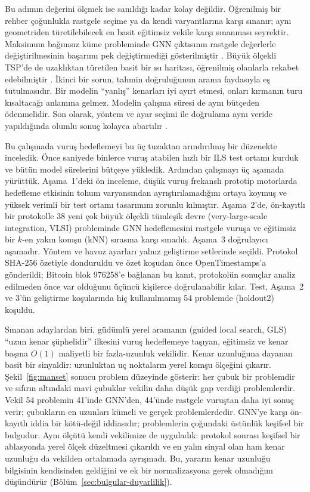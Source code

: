\documentclass[pdflatex,sn-basic]{sn-jnl}
\begin{document}
Bu adımın değerini ölçmek ise sanıldığı kadar kolay değildir. Öğrenilmiş bir rehber çoğunlukla
rastgele seçime ya da kendi varyantlarına karşı sınanır; aynı geometriden türetilebilecek en basit
eğitimsiz vekile karşı sınanması seyrektir. Maksimum bağımsız küme probleminde GNN çıktısının
rastgele değerlerle değiştirilmesinin başarımı pek değiştirmediği gösterilmiştir
\citep{bother_2022_wrong}. Büyük ölçekli TSP'de de uzaklıktan türetilen basit bir ısı haritası,
öğrenilmiş olanlarla rekabet edebilmiştir \citep{xia_2024_rethinking}. İkinci bir sorun, tahmin
doğruluğunun arama faydasıyla eş tutulmasıdır. Bir modelin ``yanlış'' kenarları iyi ayırt etmesi,
onları kırmanın turu kısaltacağı anlamına gelmez. Modelin çalışma süresi de aynı bütçeden
ödenmelidir. Son olarak, yöntem ve ayar seçimi ile doğrulama aynı veride yapıldığında olumlu sonuç
kolayca abartılır \citep{hooker_1995_testing, nosek_2018_prereg}.

Bu çalışmada vuruş hedeflemeyi bu üç tuzaktan arındırılmış bir düzenekte inceledik. Önce saniyede
binlerce vuruş atabilen hızlı bir ILS test ortamı kurduk ve bütün model sürelerini bütçeye yükledik.
Ardından çalışmayı üç aşamada yürüttük. Aşama~1'deki ön inceleme, düşük vuruş frekanslı prototip
motorlarda hedefleme etkisinin tohum varyansından ayrıştırılamadığını ortaya koymuş ve yüksek
verimli bir test ortamı tasarımını zorunlu kılmıştır. Aşama~2'de, ön-kayıtlı bir protokolle 38
yeni çok büyük ölçekli tümleşik devre (very-large-scale integration, VLSI) probleminde GNN
hedeflemesini rastgele vuruşa ve eğitimsiz bir $k$-en yakın komşu (kNN) sırasına karşı sınadık.
Aşama~3 doğrulayıcı aşamadır. Yöntem ve havuz ayarları yalnız geliştirme setlerinde seçildi. Protokol
SHA-256 özetiyle donduruldu ve özet koşudan önce OpenTimestamps'a gönderildi; Bitcoin blok
976258'e bağlanan bu kanıt, protokolün sonuçlar analiz edilmeden önce var olduğunu üçüncü
kişilerce doğrulanabilir kılar. Test, Aşama~2 ve 3'ün geliştirme koşularında hiç kullanılmamış 54
problemde (holdout2) koşuldu.

Sınanan adaylardan biri, güdümlü yerel aramanın (guided local search, GLS) ``uzun kenar şüphelidir''
ilkesini \citep{voudouris_1999_gls} vuruş hedeflemeye taşıyan, eğitimsiz ve kenar başına $O(1)$
maliyetli bir fazla-uzunluk vekilidir. Kenar uzunluğuna dayanan basit bir sinyaldir: uzunluktan uç
noktaların yerel komşu ölçeğini çıkarır. Şekil~\ref{fig:manset} sonucu problem düzeyinde gösterir: her çubuk bir problemdir ve
sıfırın altındaki mavi çubuklar vekilin daha düşük gap verdiği problemlerdir. Vekil 54 problemin
41'inde GNN'den, 44'ünde rastgele vuruştan daha iyi sonuç verir; çubukların en uzunları kümeli ve
gerçek problemlerdedir.
GNN'ye karşı ön-kayıtlı iddia bir kötü-değil iddiasıdır; problemlerin çoğundaki üstünlük keşifsel
bir bulgudur. Aynı ölçütü kendi vekilimize de uyguladık: protokol sonrası keşifsel bir ablasyonda
yerel ölçek düzeltmesi çıkarıldı ve en yalın sinyal olan ham kenar uzunluğu da vekilden ortalamada
ayrışmadı. Bu, yararın kenar uzunluğu bilgisinin kendisinden geldiğini ve ek bir normalizasyona
gerek olmadığını düşündürür (Bölüm~\ref{sec:bulgular-duyarlilik}).
\end{document}
